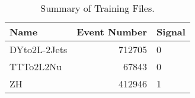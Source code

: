 \begin{table}[h!]
\centering
\begin{tabular}{lrl}
\hline
Name & Event Number & Signal \\
\hline
DYto2L-2Jets & 712705 & 0 \\
TTTo2L2Nu & 67843 & 0 \\
ZH & 412946 & 1 \\
\hline
\end{tabular}
\caption{Summary of Training Files.}
\label{tab:training_summary}
\end{table}
